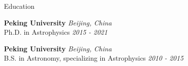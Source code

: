\documentclass{resume} %
\begin{document}
\begin{rSection}{Education}

{\bf Peking University} \hfill {\em Beijing, China}
\\ Ph.D. in Astrophysics  \hfill {\em 2015 - 2021}

{\bf Peking University} \hfill {\em Beijing, China}
\\ B.S. in Astronomy, specializing in Astrophysics  \hfill {\em 2010 - 2015}
\end{rSection}
\end{document}
